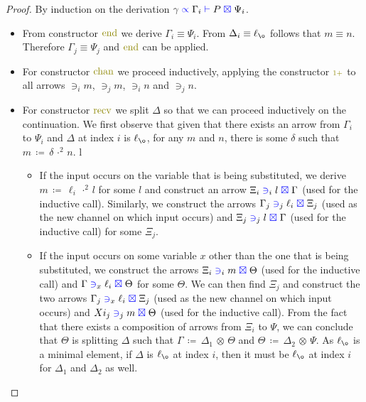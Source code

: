 \documentclass[a4paper,UKenglish,cleveref, autoref, thm-restate,authorcolumns]{lipics-v2019}
\theoremstyle{definition}
\newcommand{\type}[1]{\textcolor{blue}{\operatorname{#1}}}
\newcommand{\constr}[1]{\textcolor{olive}{\operatorname{#1}}}
\newcommand{\suc}{\constr{\scriptstyle 1+}}
\newcommand{\opsquared}[3]{#1 \, \coloneqq \, #2 \, \cdot^2 \, #3}
\newcommand{\opctx}[3]{#1 \, \coloneqq \, #2 \, \otimes \, #3}
\newcommand{\li}{\ell_i}
\newcommand{\lz}{\ell_{\o}}
\newcommand{\types}[4]{#1 \; \type{\propto} \; #2 \; \type{\vdash} \; #3 \; \type{\boxtimes} \; #4}
\newcommand{\containsusage}[4]{#1 \; \type{\ni}_{#2} \; #3 \; \type{\boxtimes} \; #4}
\begin{document}
\begin{proof}
  By induction on the derivation $\types{\gamma}{\Gamma_i}{P}{\Psi_i}$.
  \begin{itemize}
    \item
      From constructor $\constr{end}$ we derive $\Gamma_i \equiv \Psi_i$.
      From $\Delta_i \equiv \lz$ follows that $m \equiv n$.
      Therefore $\Gamma_j \equiv \Psi_j$ and $\constr{end}$ can be applied.

    \item
      For constructor $\constr{chan}$ we proceed inductively, applying the constructor $\suc$ to all arrows $\ni_i m$, $\ni_j m$, $\ni_i n$ and $\ni_j n$.
      
    \item
      For constructor $\constr{recv}$ we split $\Delta$ so that we can proceed inductively on the continuation.
      We first observe that given that there exists an arrow from $\Gamma_i$ to $\Psi_i$ and $\Delta$ at index $i$ is $\lz$, for any $m$ and $n$, there is some $\delta$ such that $\opsquared{m}{\delta}{n}$.
 l     \begin{itemize}
        \item
          If the input occurs on the variable that is being substituted, we derive $\opsquared{m}{\li}{l}$ for some $l$ and construct an arrow $\containsusage{\Xi_i}{i}{l}{\Gamma}$ (used for the inductive call).
          Similarly, we construct the arrows $\containsusage{\Gamma_j}{j}{\li}{\Xi_j}$ (used as the new channel on which input occurs) and $\containsusage{\Xi_j}{j}{l}{\Gamma}$ (used for the inductive call) for some $\Xi_j$.
        \item
          If the input occurs on some variable $x$ other than the one that is being substituted, we construct the arrows $\containsusage{\Xi_i}{i}{m}{\Theta}$ (used for the inductive call) and $\containsusage{\Gamma}{x}{\li}{\Theta}$ for some $\Theta$.
          We can then find $\Xi_j$ and construct the two arrows $\containsusage{\Gamma_j}{x}{\li}{\Xi_j}$ (used as the new channel on which input occurs) and $\containsusage{Xi_j}{j}{m}{\Theta}$ (used for the inductive call).
          From the fact that there exists a composition of arrows from $\Xi_i$ to $\Psi$, we can conclude that $\Theta$ is splitting $\Delta$ such that $\opctx{\Gamma}{\Delta_1}{\Theta}$ and $\opctx{\Theta}{\Delta_2}{\Psi}$.
          As $\lz$ is a minimal element, if $\Delta$ is $\lz$ at index $i$, then it must be $\lz$ at index $i$ for $\Delta_1$ and $\Delta_2$ as well.
      \end{itemize}


\end{itemize}
\end{proof}
\end{document}
